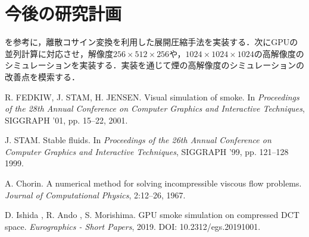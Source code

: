 \documentclass[10pt,a4paper,notitlepage,oneside,twocolumn]{abst_jsarticle}
\begin{document}
\section{今後の研究計画}
\cite{GPU}を参考に，離散コサイン変換を利用した展開圧縮手法を実装する．次にGPUの並列計算に対応させ，解像度$256\times512\times256$や，$1024\times1024\times1024$の高解像度のシミュレーションを実装する．実装を通じて煙の高解像度のシミュレーションの改善点を模索する．
\begin{thebibliography}{99}

R. FEDKIW, J. STAM, H. JENSEN. Visual simulation of smoke. In \textit{Proceedings of the 28th Annual Conference on Computer Graphics and Interactive Techniques}, SIGGRAPH ’01, pp. 15--22, 2001.

J. STAM. Stable fluids. In \textit{Proceedings of the 26th Annual Conference on Computer Graphics and Interactive Techniques}, SIGGRAPH ’99, pp. 121--128 1999.

A. Chorin. A numerical method for solving incompressible viscous flow problems. \textit{Journal of Computational Physics}, 2:12--26, 1967.

D. Ishida , R. Ando , S. Morishima. GPU smoke simulation on compressed DCT space. \textit{Eurographics - Short Papers}, 2019. DOI: 10.2312/egs.20191001.

\end{thebibliography}
\end{document}
